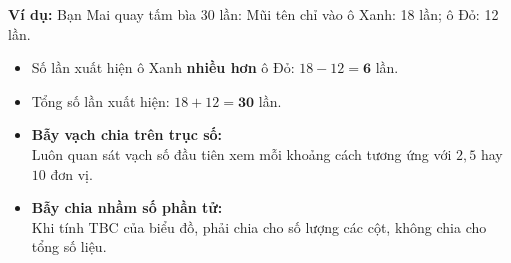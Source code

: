 \documentclass[14pt,a4paper,oneside]{extbook}
\begin{document}
\vspace{-2.5mm}
\noindent
\begin{minipage}[t]{0.49\textwidth}\vspace{0pt}
\begin{tcolorbox}[
  enhanced,
  colback=green!4!white,
  colframe=green!60!black,
  arc=2mm, boxrule=0.8pt,
  left=2mm, right=2mm, top=1.8mm, bottom=1.8mm,
  title={\footnotesize\bfseries\color{white}\faCheckCircle\ Ví dụ thực hành chuẩn mực}
]
{\footnotesize
\textbf{Ví dụ:} Bạn Mai quay tấm bìa 30 lần:
Mũi tên chỉ vào ô Xanh: 18 lần; ô Đỏ: 12 lần.
\begin{itemize}\setlength{\itemsep}{1pt}\setlength{\leftskip}{-2.5mm}
  \item Số lần xuất hiện ô Xanh \textbf{nhiều hơn} ô Đỏ: $18 - 12 = \mathbf{6}$ lần.
  \item Tổng số lần xuất hiện: $18 + 12 = \mathbf{30}$ lần.
\end{itemize}
}
\end{tcolorbox}
\end{minipage}
\hfill
\begin{minipage}[t]{0.49\textwidth}\vspace{0pt}
\begin{tcolorbox}[
  enhanced,
  colback=red!4!white,
  colframe=red!70!black,
  arc=2mm, boxrule=0.8pt,
  left=2mm, right=2mm, top=1.8mm, bottom=1.8mm,
  title={\footnotesize\bfseries\color{white}\faExclamationTriangle\ Mẹo tránh bẫy trắc nghiệm}
]
{\footnotesize
\begin{itemize}\setlength{\itemsep}{1.5pt}\setlength{\leftskip}{-2.5mm}
  \item \textbf{Bẫy vạch chia trên trục số:}\\
  Luôn quan sát vạch số đầu tiên xem mỗi khoảng cách tương ứng với $2, 5$ hay $10$ đơn vị.
  \item \textbf{Bẫy chia nhầm số phần tử:}\\
  Khi tính TBC của biểu đồ, phải chia cho số lượng các cột, không chia cho tổng số liệu.
\end{itemize}
}
\end{tcolorbox}
\end{minipage}
\end{document}
